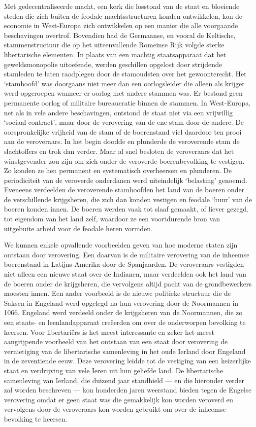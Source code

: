 \documentclass[
  a5paper,
  smalldemyvopaper,10pt,twoside,onecolumn,openright,extrafontsizes,hidelinks]{memoir}
\begin{document}
Met gedecentraliseerde macht, een kerk die losstond van de staat en
bloeiende steden die zich buiten de feodale machtsstructuren konden
ontwikkelen, kon de economie in West-Europa zich ontwikkelen op een
manier die alle voorgaande beschavingen overtrof. Bovendien had de
Germaanse, en vooral de Keltische, stammenstructuur die op het
uiteenvallende Romeinse Rijk volgde sterke libertarische elementen. In
plaats van een machtig staatsapparaat dat het geweldsmonopolie
uitoefende, werden geschillen opgelost door strijdende stamleden te
laten raadplegen door de stamoudsten over het gewoonterecht. Het
`stamhoofd' was doorgaans niet meer dan een oorlogsleider die alleen als
krijger werd opgeroepen wanneer er oorlog met andere stammen was. Er
bestond geen permanente oorlog of militaire bureaucratie binnen de
stammen. In West-Europa, net als in vele andere beschavingen, ontstond
de staat niet via een vrijwillig `sociaal contract', maar door de
verovering van de ene stam door de andere. De oorspronkelijke vrijheid
van de stam of de boerenstand viel daardoor ten prooi aan de
veroveraars. In het begin doodde en plunderde de veroverende stam de
slachtoffers en trok dan verder. Maar al snel besloten de veroveraars
dat het winstgevender zou zijn om zich onder de veroverde
boerenbevolking te vestigen. Zo konden ze hen permanent en systematisch
overheersen en plunderen. De periodiciteit van de veroverde onderdanen
werd uiteindelijk `belasting' genoemd. Eveneens verdeelden de
veroverende stamhoofden het land van de boeren onder de verschillende
krijgsheren, die zich dan konden vestigen en feodale `huur' van de
boeren konden innen. De boeren werden vaak tot slaaf gemaakt, of liever
gezegd, tot eigendom van het land zelf, waardoor ze een voortdurende
bron van uitgebuite arbeid voor de feodale heren vormden.

We kunnen enkele opvallende voorbeelden geven van hoe moderne staten
zijn ontstaan door verovering. Een daarvan is de militaire verovering
van de inheemse boerenstand in Latijns-Amerika door de Spanjaarden. De
veroveraars vestigden niet alleen een nieuwe staat over de Indianen,
maar verdeelden ook het land van de boeren onder de krijgsheren, die
vervolgens altijd pacht van de grondbewerkers moesten innen. Een ander
voorbeeld is de nieuwe politieke structuur die de Saksen in Engeland
werd opgelegd na hun verovering door de Noormannen in 1066. Engeland
werd verdeeld onder de krijgsheren van de Noormannen, die zo een staats-
en leenlandapparaat creëerden om over de onderworpen bevolking te
heersen. Voor libertariërs is het meest interessante en zeker het meest
aangrijpende voorbeeld van het ontstaan van een staat door verovering de
vernietiging van de libertarische samenleving in het oude Ierland door
Engeland in de zeventiende eeuw. Deze verovering leidde tot de vestiging
van een keizerlijke staat en verdrijving van vele Ieren uit hun geliefde
land. De libertarische samenleving van Ierland, die duizend jaar
standhield --- en die hieronder verder zal worden beschreven --- kon
honderden jaren weerstand bieden tegen de Engelse verovering omdat er
geen staat was die gemakkelijk kon worden veroverd en vervolgens door de
veroveraars kon worden gebruikt om over de inheemse bevolking te
heersen.
\end{document}
